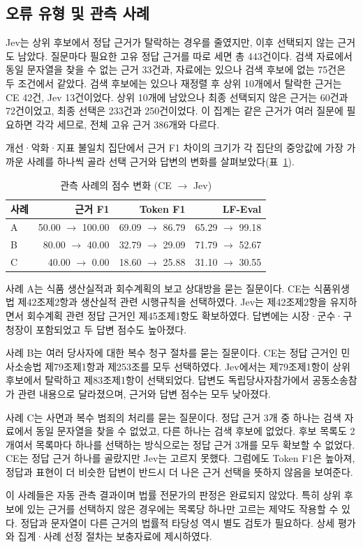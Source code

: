 \subsection{오류 유형 및 관측 사례}
\label{sec:ch4_errors}

Jev는 상위 후보에서 정답 근거가 탈락하는 경우를 줄였지만, 이후 선택되지 않는 근거도 남았다. 질문마다 필요한 고유 정답 근거를 따로 세면 총 443건이다. 검색 자료에서 동일 문자열을 찾을 수 없는 근거 33건과, 자료에는 있으나 검색 후보에 없는 75건은 두 조건에서 같았다. 검색 후보에는 있으나 재정렬 후 상위 10개에서 탈락한 근거는 CE 42건, Jev 13건이었다. 상위 10개에 남았으나 최종 선택되지 않은 근거는 60건과 72건이었고, 최종 선택은 233건과 250건이었다. 이 집계는 같은 근거가 여러 질문에 필요하면 각각 세므로, 전체 고유 근거 386개와 다르다.

개선·악화·지표 불일치 집단에서 근거 F1 차이의 크기가 각 집단의 중앙값에 가장 가까운 사례를 하나씩 골라 선택 근거와 답변의 변화를 살펴보았다(표~\ref{tab:ch4_cases}).

\begin{table}[htbp]
\centering
\caption{관측 사례의 점수 변화 (CE $\to$ Jev)}
\label{tab:ch4_cases}
\small
\setlength{\tabcolsep}{3pt}
\begin{tabular}{@{}lrrr@{}}
\hline
사례 & 근거 F1 & Token F1 & LF-Eval \\
\hline
A & 50.00 $\to$ 100.00 & 69.09 $\to$ 86.79 & 65.29 $\to$ 99.18 \\
B & 80.00 $\to$ 40.00 & 32.79 $\to$ 29.09 & 71.79 $\to$ 52.67 \\
C & 40.00 $\to$ 0.00 & 18.60 $\to$ 25.88 & 31.10 $\to$ 30.55 \\
\hline
\end{tabular}
\end{table}

사례 A는 식품 생산실적과 회수계획의 보고 상대방을 묻는 질문이다. CE는 식품위생법 제42조제2항과 생산실적 관련 시행규칙을 선택하였다. Jev는 제42조제2항을 유지하면서 회수계획 관련 정답 근거인 제45조제1항도 확보하였다. 답변에는 시장·군수·구청장이 포함되었고 두 답변 점수도 높아졌다.

사례 B는 여러 당사자에 대한 복수 청구 절차를 묻는 질문이다. CE는 정답 근거인 민사소송법 제79조제1항과 제253조를 모두 선택하였다. Jev에서는 제79조제1항이 상위 후보에서 탈락하고 제83조제1항이 선택되었다. 답변도 독립당사자참가에서 공동소송참가 관련 내용으로 달라졌으며, 근거와 답변 점수는 모두 낮아졌다.

사례 C는 사면과 복수 범죄의 처리를 묻는 질문이다. 정답 근거 3개 중 하나는 검색 자료에서 동일 문자열을 찾을 수 없었고, 다른 하나는 검색 후보에 없었다. 후보 목록도 2개여서 목록마다 하나를 선택하는 방식으로는 정답 근거 3개를 모두 확보할 수 없었다. CE는 정답 근거 하나를 골랐지만 Jev는 고르지 못했다. 그럼에도 Token F1은 높아져, 정답과 표현이 더 비슷한 답변이 반드시 더 나은 근거 선택을 뜻하지 않음을 보여준다.

이 사례들은 자동 관측 결과이며 법률 전문가의 판정은 완료되지 않았다. 특히 상위 후보에 있는 근거를 선택하지 않은 경우에는 목록당 하나만 고르는 제약도 작용할 수 있다. 정답과 문자열이 다른 근거의 법률적 타당성 역시 별도 검토가 필요하다. 상세 평가와 집계·사례 선정 절차는 보충자료에 제시하였다.

